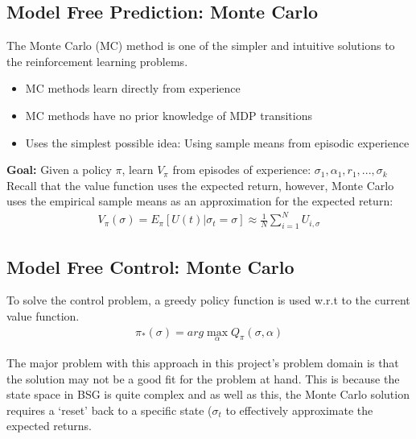 \documentclass[ %
                    author={Ashwinder Khurana},
                supervisor={Prof Dave Cliff},
                    degree={MEng},
                     title={The Deeply Reinforced Trader},
                  subtitle={},
                      type={enterprise},
                      year={2020} ]{dissertation}
\begin{document}
{\subsection{Model Free Prediction: Monte Carlo }
\label{Monte Carlo Prediction}
The Monte Carlo (MC) method is one of the simpler and intuitive solutions to the reinforcement learning problems.
\begin{itemize}
\item MC methods learn directly from experience
\item MC methods have no prior knowledge of MDP transitions 
\item Uses the simplest possible idea: Using sample means from episodic experience 
\end{itemize}

\noindent
\textbf{Goal: } Given a policy $\pi$, learn $V_\pi$ from episodes of experience: $\sigma_1, \alpha_1, r_1,..., \sigma_k$
Recall that the value function uses the expected return, however, Monte Carlo uses the empirical sample means as an approximation for the expected return:
\begin{equation}
\label{Monte Carlo Mean}
\begin{split}
V_\pi (\sigma) = E_\pi [U(t) | \sigma_t = \sigma] \approx \frac{1}{N} \sum\limits^{N}_{i=1}{U_{i,\sigma}}
\end{split}
\end{equation}
\noindent 

\subsection{Model Free Control: Monte Carlo}
To solve the control problem, a greedy policy function is used w.r.t to the current value function. 
\begin{equation}
\label{Monte Carlo Control}
\begin{split}
\pi_*(\sigma) = arg\max\limits^{}_{\alpha}{Q_\pi(\sigma,\alpha)}
\end{split}
\end{equation}

\noindent
The major problem with this approach in this project’s problem domain is that the solution may not be a good fit for the problem at hand. This is because the state space in BSG is quite complex and as well as this, the Monte Carlo solution requires a \enquote*{reset} back to a specific state (${\sigma_t}$ to effectively approximate the expected returns.

}
\end{document}
